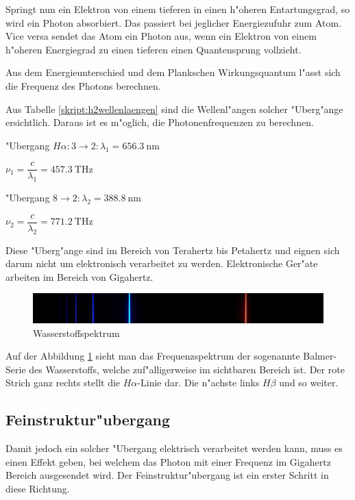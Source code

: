 \begin{refsection}
Springt nun ein Elektron von einem tieferen in einen h"oheren
Entartungsgrad, so wird ein Photon absorbiert.  Das passiert bei
jeglicher Energiezufuhr zum Atom.  Vice versa sendet das Atom ein
Photon aus, wenn ein Elektron von einem h"oheren Energiegrad zu einen
tieferen einen Quantensprung vollzieht.

Aus dem Energieunterschied und dem Plankschen Wirkungsquantum l"asst
sich die Frequenz des Photons
berechnen. %

Aus Tabelle \ref{skript:h2wellenlaengen} sind die Wellenl"angen
solcher "Uberg"ange ersichtlich. Daraus ist es m"oglich, die
Photonenfrequenzen zu berechnen.
\begin{center}
	"Ubergang $H\alpha: 3 \rightarrow 2: \lambda_1 = \SI{656.3}{\nano\meter}$

$\nu_1 = \dfrac{c}{\lambda_1} = \SI{457.3}{\tera\hertz}$
\vspace{.5cm}

"Ubergang $8 \rightarrow 2: \lambda_2 = \SI{388.8}{\nano\meter}$

$\nu_2 = \dfrac{c}{\lambda_2} = \SI{771.2}{\tera\hertz}$
\end{center}	

Diese "Uberg"ange sind im Bereich von Terahertz bis Petahertz und
eignen sich darum nicht um elektronisch verarbeitet zu
werden. Elektronische Ger"ate arbeiten im Bereich von Gigahertz.

\begin{figure}
	\centering
	\includegraphics[width = .6\columnwidth]{../vortrag/pictures/wasserstoffSpektrum.jpg}
	\caption{Wasserstoffspektrum} %
	\label{atomuhr:wasserstoffspektrum}
\end{figure}

Auf der Abbildung \ref{atomuhr:wasserstoffspektrum} sieht man das
Frequenzspektrum der sogenannte Balmer-Serie des Wasserstoffs, welche
zuf"alligerweise im sichtbaren Bereich ist. Der rote Strich ganz rechts
stellt die $H\alpha$-Linie dar. Die n"achste links $H\beta$ und so
weiter.


\subsection{Feinstruktur"ubergang}
Damit jedoch ein solcher "Ubergang elektrisch verarbeitet werden kann,
muss es einen Effekt geben, bei welchem das Photon mit einer Frequenz
im Gigahertz Bereich ausgesendet wird.  Der Feinstruktur"ubergang ist
ein erster Schritt in diese Richtung.


\end{refsection}
